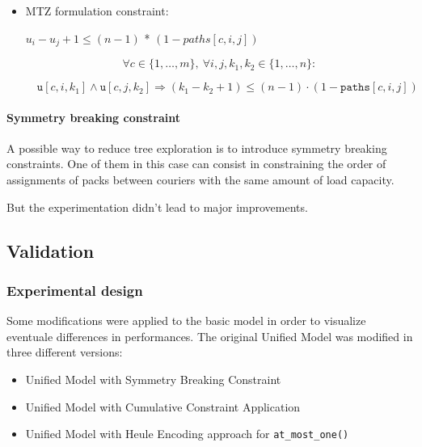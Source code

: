 \begin{itemize}
\begin{itemize}
\begin{itemize}
            \item MTZ formulation constraint:
            \begin{center}
                $u_i - u_j + 1 \leq (n - 1)$ * $(1 - paths[c, i, j] )$
            \end{center}
            \begin{equation}
                \label{eq:subtour_constr5}
                \forall c \in \{1, \dots, m\}, \ \forall i, j, k_1, k_2 \in \{1, \dots, n\}: 
            \end{equation}
            \begin{center}\[
                \quad
                \texttt{u}[c, i, k_1] \land \texttt{u}[c, j, k_2] \Longrightarrow
                (k_1 - k_2 + 1) \leq (n-1) \cdot (1 - \texttt{paths}[c, i, j])
                \]
            \end{center}
        \end{itemize}
    \end{itemize}
\end{itemize}

\paragraph*{Symmetry breaking constraint}

A possible way to reduce tree exploration is to introduce symmetry breaking constraints.
One of them in this case can consist in constraining the order of assignments of packs between couriers with the same amount of load capacity.

But the experimentation didn't lead to major improvements.

\subsection{Validation}

\subsubsection*{Experimental design}

Some modifications were applied to the basic model in order to visualize eventuale differences in performances.
The original Unified Model was modified in three different versions:
\begin{itemize}
    \item Unified Model with Symmetry Breaking Constraint
    \item Unified Model with Cumulative Constraint Application
    \item Unified Model with Heule Encoding approach for \texttt{at\_most\_one()}
\end{itemize}
